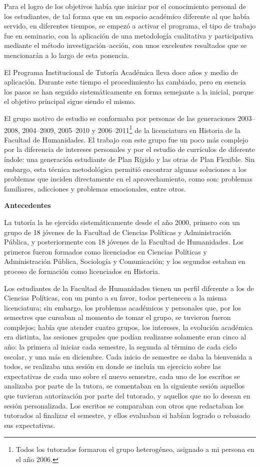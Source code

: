 Para el logro de los objetivos había que iniciar por el conocimiento
personal de los estudiantes, de tal forma que en un espacio académico
diferente al que había servido, en  diferentes tiempos, se empezó a
activar el programa, el tipo de trabajo fue en seminario, con la aplicación
de una metodología cualitativa y participativa mediante el método 
investigación–acción, con unos excelentes resultados que se mencionarán 
a lo largo de esta ponencia.


El Programa Institucional de Tutoría Académica lleva doce años y medio de
aplicación. Durante este tiempo el procedimiento ha cambiado, pero en
esencia los pasos se han seguido sistemáticamente en forma semejante a la
inicial, porque el objetivo principal sigue siendo el \mbox{mismo}.


El grupo motivo de estudio se conformaba por personas de las generaciones
2003--2008, 2004--2009, 2005--2010 y 2006--2011\footnote{Todos los
tutorados formaron el grupo heterogéneo,  asignado a mi persona en el año
2006.} de la licenciatura en Historia de la Facultad de Humanidades. El
trabajo con este grupo fue un poco más complejo por la diferencia de
intereses personales y por el estudio de currículos de diferente índole:
una generación estudiante de Plan Rígido y las otras de Plan Flexible. Sin
embargo, esta técnica metodológica permitió encontrar algunas soluciones a
los problemas que inciden directamente en el aprovechamiento, como son:
problemas familiares, adicciones y problemas emocionales, entre otros.


\bigskip
\textbf{Antecedentes}

La tutoría la he ejercido sistemáticamente desde el año 2000, primero con
un grupo de 18 jóvenes de la Facultad de Ciencias Políticas y\linebreak
Administración Pública, y posteriormente con 18 jóvenes de la Facultad de
Humanidades. Los primeros fueron formados como licenciados en Ciencias
Políticas y Administración Pública, Sociología y Comunicación; y los
segundos estaban en proceso de formación como licenciados en Historia.


Los estudiantes de la Facultad de Humanidades tienen un perfil diferente a
los de Ciencias Políticas, con un punto a su favor, todos pertenecen a la
misma licenciatura; sin embargo, los problemas académicos y personales que,
por los semestres que cursaban al momento de tomar el grupo, se tuvieron
fueron complejos; había que atender cuatro grupos, los intereses, la
evolución académica era distinta, las sesiones grupales que podían
realizarse solamente eran cinco al año: la primera al iniciar cada
semestre, la segunda al término de cada ciclo escolar, y una más en
diciembre. Cada inicio de semestre se daba la bienvenida a todos, se
realizaba una sesión en donde se incluía un ejercicio sobre las
expectativas de cada uno sobre el nuevo semestre, cada uno de los escritos
se analizaba por parte de la tutora, se comentaban en la siguiente sesión
aquellos que tuvieran autorización por parte del tutorado, y aquellos que
no lo desean en sesión personalizada. Los escritos se comparaban con otros
que redactaban los tutorados al finalizar el semestre, y ellos evaluaban 
si habían logrado o rebasado sus expectativas.


